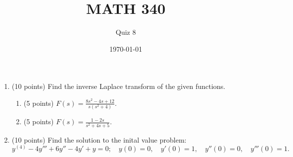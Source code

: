 \documentclass{article}
\begin{document}
\title{MATH 340}
\author{Quiz 8}
\date{\today}
\maketitle

\begin{enumerate}
	\item (10 points) Find the inverse Laplace transform of the given functions.
		\begin{enumerate}
			\item (5 points) $F(s)=\frac{8s^2-4s+12}{s(s^2+4)}$.
			\item (5 points) $F(s)=\frac{1-2s}{s^2+4s+5}$.
		\end{enumerate}
	\item (10 points) Find the solution to the inital value problem:
	\[
		y^{(4)} - 4y''' + 6y'' -4y' + y=0;\quad y(0)=0, \quad y'(0)=1, \quad y''(0)=0, \quad y'''(0)=1.
	\]
\end{enumerate}
\end{document}
